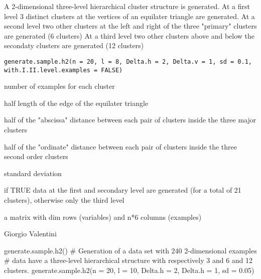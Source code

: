 \documentclass{article}
\begin{document}
\begin{Description}\relax
A 2-dimensional three-level hierarchical cluster structure is generated.
At a first level 3 distinct clusters at the vertices of an equilater triangle are generated.
At a second level two other clusters at the left and right of the three "primary" clusters are generated (6 clusters)
At a third level two other clusters above and below the secondaty clusters are generated (12 clusters)
\end{Description}
\begin{Usage}
\begin{verbatim}
generate.sample.h2(n = 20, l = 8, Delta.h = 2, Delta.v = 1, sd = 0.1, with.I.II.level.examples = FALSE)
\end{verbatim}
\end{Usage}
\begin{Arguments}
\begin{ldescription}
\item[\code{n}] number of examples for each cluster 
\item[\code{l}] half length of the edge of the equilater triangle 
\item[\code{Delta.h}] half of the "abscissa" distance between each pair of clusters inside the three major clusters 
\item[\code{Delta.v}] half of the "ordinate" distance between each pair of clusters inside the three second order clusters 
\item[\code{sd}] standard deviation 
\item[\code{with.I.II.level.examples}] if TRUE data at the first and secondary level are generated (for a total of 21 clusters), otherwise only the third level
\end{ldescription}
\end{Arguments}
\begin{Value}
a matrix with dim rows (variables) and n*6 columns (examples)
\end{Value}
\begin{Author}\relax
Giorgio Valentini 
\end{Author}
\begin{Examples}
\begin{ExampleCode}
generate.sample.h2()
# Generation of a data set with 240 2-dimensional examples
# data have a three-level hierarchical structure with respectively 3 and 6 and 12 clusters. 
generate.sample.h2(n = 20, l = 10, Delta.h = 2, Delta.h = 1, sd = 0.05)
\end{ExampleCode}
\end{Examples}
\end{document}
